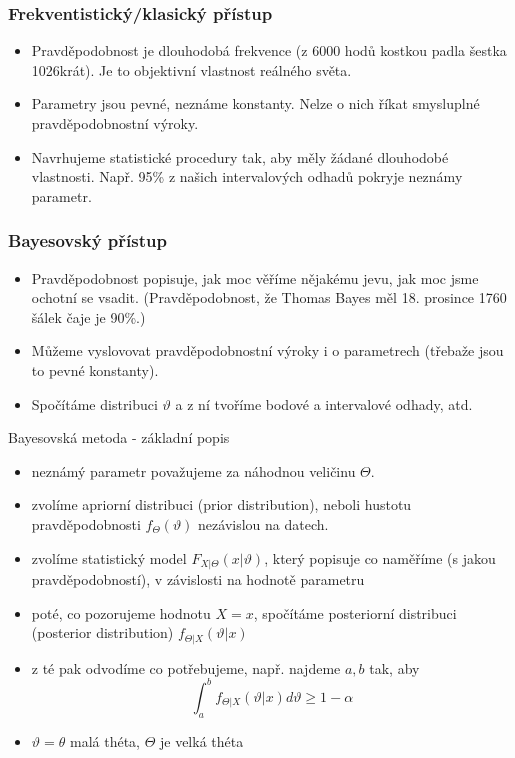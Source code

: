 \documentclass[../main.tex]{subfiles}
\begin{document}
\subsubsection{Frekventistický/klasický přístup}

\begin{itemize}
    \item Pravděpodobnost je dlouhodobá frekvence (z 6000 hodů kostkou padla šestka 1026krát). Je to objektivní vlastnost reálného světa.
    \item Parametry jsou pevné, neznáme konstanty. Nelze o nich říkat smysluplné pravděpodobnostní výroky.
    \item Navrhujeme statistické procedury tak, aby měly žádané dlouhodobé vlastnosti. Např. 95\% z našich intervalových odhadů pokryje neznámy parametr.
\end{itemize}

\subsubsection{Bayesovský přístup}
\begin{itemize}
    \item Pravděpodobnost popisuje, jak moc věříme nějakému jevu, jak moc jsme ochotní se vsadit. (Pravděpodobnost, že Thomas Bayes měl 18. prosince 1760 šálek čaje je 90\%.)
    \item Můžeme vyslovovat pravděpodobnostní výroky i o parametrech (třebaže jsou to pevné konstanty).
    \item Spočítáme distribuci $\vartheta$ a z ní tvoříme bodové a intervalové odhady, atd.
\end{itemize}

Bayesovská metoda - základní popis
\begin{itemize}
    \item neznámý parametr považujeme za náhodnou veličinu $\Theta$.
    \item zvolíme apriorní distribuci (prior distribution), neboli hustotu pravděpodobnosti $f_{\Theta}(\vartheta)$ nezávislou na datech.
    \item zvolíme statistický model $F_{X|\Theta}(x|\vartheta)$, který popisuje co naměříme (s jakou pravděpodobností), v závislosti na hodnotě parametru
    \item poté, co pozorujeme hodnotu $X = x$, spočítáme posteriorní distribuci (posterior distribution) $f_{\Theta|X}(\vartheta|x)$
    \item z té pak odvodíme co potřebujeme, např. najdeme $a,b$ tak, aby 
    \[\int^b_a f_{\Theta|X}(\vartheta|x)d\vartheta \geq 1 - \alpha\]
    \item $\vartheta = \theta$ malá théta, $\Theta$ je velká théta 
\end{itemize}
\end{document}

